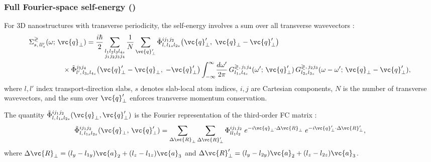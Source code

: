 \subsubsection{Full Fourier-space self-energy (\cite[Eq. 14]{guo_quantum_2020})}
\label{sec:sigma_fourier}

For 3D nanostructures with transverse periodicity, the
self-energy involves a sum over all transverse wavevectors \cite[Eq. 14]{guo_quantum_2020}:
\begin{align}\label{eq:sigma_phph}
  \Sigma^{\gtrless}_{s,\,ll'_s}(&\omega;\,\vc{q}_\perp)
  = \frac{i\hbar}{2}
    \sum_{\substack{l_1 l_2 l_3 l_{4s} \\ j_1 j_2 j_3 j_4}}
    \frac{1}{N} \sum_{\vc{q}'_\perp}
    \tilde{\Phi}^{ij_1 j_2}_{l,\,l_{1s} l_{2s}}
      \!\left(\vc{q}'_\perp,\;\vc{q}_\perp - \vc{q}'_\perp\right)
    \notag \\
  &\qquad\times
    \tilde{\Phi}^{j_3 j_4}_{l',\,l_{3s} l_{4s}}
      \!\left(\vc{q}'_\perp - \vc{q}_\perp,\;-\vc{q}'_\perp\right)
    \int_{-\infty}^{\infty}\!\frac{d\omega'}{2\pi}
    \,G^{\gtrless,\,j_1 j_4}_{l_{1s} l_{4s}}(\omega';\,\vc{q}'_\perp)\,
    G^{\gtrless,\,j_2 j_3}_{l_{2s} l_{3s}}
      (\omega - \omega';\,\vc{q}_\perp - \vc{q}'_\perp),
\end{align}
where $l, l'$ index transport-direction slabs, $s$ denotes slab-local
atom indices, $i, j$ are Cartesian components, $N$ is the number of
transverse wavevectors, and the sum over $\vc{q}'_\perp$ enforces
transverse momentum conservation.

The quantity
$\tilde{\Phi}^{ij_1 j_2}_{l,\,l_{1s} l_{2s}}(\vc{q}_\perp, \vc{q}'_\perp)$
is the Fourier representation of the third-order FC matrix \cite[Eq. 16]{guo_quantum_2020}:
\begin{equation}\label{eq:fc3_fourier}
  \tilde{\Phi}^{ij_1 j_2}_{l,\,l_{1s} l_{2s}}
  (\vc{q}_\perp,\,\vc{q}'_\perp)
  = \sum_{\Delta\vc{R}_\perp}\sum_{\Delta\vc{R}'_\perp}
    \Phi^{ij_1 j_2}_{l l_{1} l_{2}}\;
    e^{-i\vc{q}_\perp\cdot\Delta\vc{R}_\perp}\;
    e^{-i\vc{q}'_\perp\cdot\Delta\vc{R}'_\perp},
\end{equation}
where
$\Delta\vc{R}_\perp = (l_y - l_{1y})\vc{a}_2 + (l_z - l_{1z})\vc{a}_3$
and
$\Delta\vc{R}'_\perp = (l_y - l_{2y})\vc{a}_2 + (l_z - l_{2z})\vc{a}_3$.

